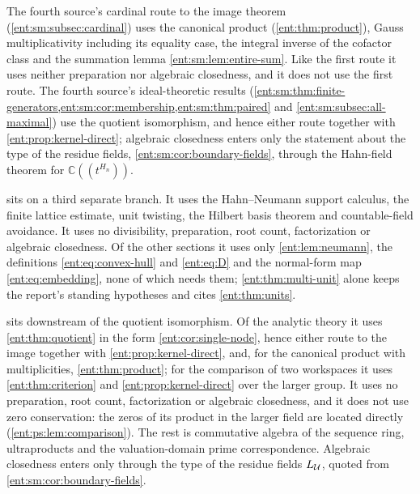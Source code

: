 \documentclass[11pt]{article}
\theoremstyle{plain}
\theoremstyle{plain}
\theoremstyle{plain}
\theoremstyle{definition}
\theoremstyle{definition}
\theoremstyle{definition}
\theoremstyle{definition}
\theoremstyle{remark}
\newcommand{\C}{\mathbb C}\newcommand{\R}{\mathbb R}
\begin{document}
The fourth source's cardinal route to the image theorem
(\cref{ent:sm:subsec:cardinal}) uses the canonical product
(\cref{ent:thm:product}), Gauss multiplicativity including its equality
case, the integral inverse of the cofactor class and the summation lemma
\cref{ent:sm:lem:entire-sum}. Like the first route it uses neither
preparation nor algebraic closedness, and it does not use the first route.
The fourth source's ideal-theoretic results
(\cref{ent:sm:thm:finite-generators,ent:sm:cor:membership,ent:sm:thm:paired}
and \cref{ent:sm:subsec:all-maximal}) use the quotient isomorphism, and hence
either route together with \cref{ent:prop:kernel-direct}; algebraic
closedness enters only the statement about the type of the residue fields,
\cref{ent:sm:cor:boundary-fields}, through the Hahn-field theorem for
$\C((t^{H_n}))$.

 sits on a third separate branch. It uses the
Hahn--Neumann support calculus, the finite lattice estimate, unit twisting,
the Hilbert basis theorem and countable-field avoidance. It uses no
divisibility, preparation, root count, factorization or algebraic closedness.
Of the other sections it uses only \cref{ent:lem:neumann}, the definitions
\eqref{ent:eq:convex-hull} and \eqref{ent:eq:D} and the normal-form map
\eqref{ent:eq:embedding}, none of which needs them;
\cref{ent:thm:multi-unit} alone keeps the report's standing hypotheses and
cites \cref{ent:thm:units}.

 sits downstream of the quotient isomorphism. Of
the analytic theory it uses \cref{ent:thm:quotient} in the form
\cref{ent:cor:single-node}, hence either route to the image together with
\cref{ent:prop:kernel-direct}, and, for the canonical product with
multiplicities, \cref{ent:thm:product}; for the comparison of two workspaces
it uses \cref{ent:thm:criterion} and \cref{ent:prop:kernel-direct} over the
larger group. It uses no preparation, root count, factorization or algebraic
closedness, and it does not use zero conservation: the zeros of its product
in the larger field are located directly (\cref{ent:ps:lem:comparison}).
The rest is commutative algebra of the sequence ring, ultraproducts and the
valuation-domain prime correspondence. Algebraic closedness enters only
through the type of the residue fields $L_\mathcal U$, quoted from
\cref{ent:sm:cor:boundary-fields}.
\end{document}
